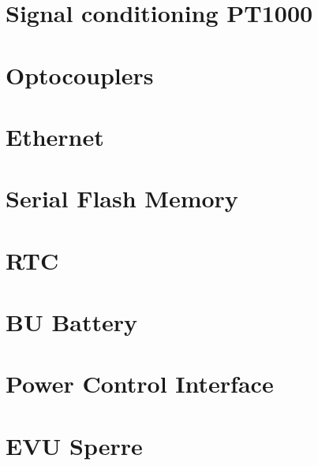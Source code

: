 \section{Signal conditioning PT1000}
\label{sec: Signal conditioning PT1000}


\section{Optocouplers}
\label{sec: Optocouplers}


\section{Ethernet}
\label{sec: Ethernet}


\section{Serial Flash Memory}
\label{sec: Serial Flash Memory}


\section{RTC}
\label{sec: RTC}


\section{BU Battery}
\label{sec: BU Battery}


\section{Power Control Interface}
\label{sec: Power Control Interface}


\section{EVU Sperre}
\label{sec: EVU Sperre}


